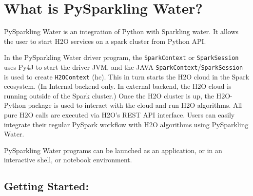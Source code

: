 \section{What is PySparkling Water?}

PySparkling Water is an integration of Python with Sparkling water. It allows the user to start H2O services on a spark cluster from Python API.

In the PySparkling Water driver program, the \texttt{SparkContext} or \texttt{SparkSession} uses Py4J to start the driver JVM, and the JAVA \texttt{SparkContext}/\texttt{SparkSession} is used to create \texttt{H2OContext} (hc). This in turn starts the H2O cloud in the Spark ecosystem. (In Internal backend only. In external backend, the H2O cloud is running outside of the Spark cluster.)
Once the H2O cluster is up, the H2O-Python package is used to interact with the cloud and run H2O algorithms. All pure H2O calls are executed via H2O's REST API interface. Users can easily integrate their regular PySpark workflow with H2O algorithms using PySparkling Water.

PySparkling Water programs can be launched as an application, or in an interactive shell, or notebook environment.

\subsection{Getting Started:}

